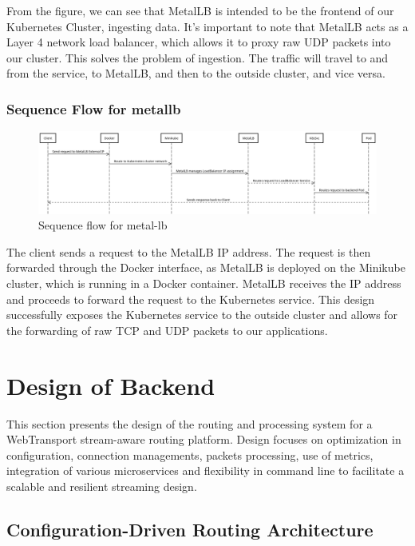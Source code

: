 From the figure, we can see that MetalLB is intended to be the frontend of our Kubernetes Cluster, ingesting data. It's important to note that MetalLB acts as a Layer 4 network load balancer, which allows it to proxy raw UDP packets into our cluster. This solves the problem of ingestion. The traffic will travel to and from the service, to MetalLB, and then to the outside cluster, and vice versa.



\subsubsection{Sequence Flow for metallb}
\begin{figure}[H]
\caption{Sequence flow for metal-lb}
\centering
\includegraphics[width=1\textwidth]{Design/metal_sequence.png}
\end{figure}

The client sends a request to the MetalLB IP address. The request is then forwarded through the Docker interface, as MetalLB is deployed on the Minikube cluster, which is running in a Docker container. MetalLB receives the IP address and proceeds to forward the request to the Kubernetes service. This design successfully exposes the Kubernetes service to the outside cluster and allows for the forwarding of raw TCP and UDP packets to our applications.

\section{Design of Backend}

This section presents the design of the routing and processing system for a WebTransport stream-aware routing platform. Design focuses on optimization in configuration, connection managements, packets processing, use of metrics, integration of various microservices and flexibility in command line to facilitate a scalable and resilient streaming design.

\subsection{Configuration-Driven Routing Architecture}



